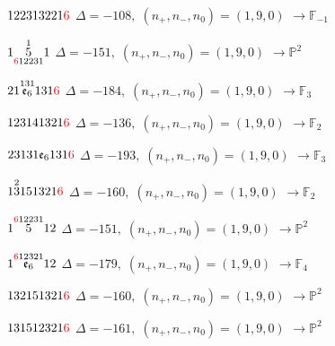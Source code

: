 \documentclass[10pt]{article}
\begin{document}
\smallskip

$122313221\textcolor{red}{6}$ \quad $\Delta=-108,\; (n_+,n_-,n_0)=(1,9,0)$ \quad $\to \mathbb{F}_{-1}$

\smallskip

$1\overset{1}{\underset{\textcolor{red}{6}12231}{5}}1$ \quad $\Delta=-151,\; (n_+,n_-,n_0)=(1,9,0)$ \quad $\to \mathbb{P}^2$

\smallskip

$21\overset{131}{\mathfrak{e}_6}131\textcolor{red}{6}$ \quad $\Delta=-184,\; (n_+,n_-,n_0)=(1,9,0)$ \quad $\to \mathbb{F}_{3}$

\smallskip

$123141321\textcolor{red}{6}$ \quad $\Delta=-136,\; (n_+,n_-,n_0)=(1,9,0)$ \quad $\to \mathbb{F}_{2}$

\smallskip

$23131\mathfrak{e}_6131\textcolor{red}{6}$ \quad $\Delta=-193,\; (n_+,n_-,n_0)=(1,9,0)$ \quad $\to \mathbb{F}_{3}$

\smallskip

$1\overset{2}{3}151321\textcolor{red}{6}$ \quad $\Delta=-160,\; (n_+,n_-,n_0)=(1,9,0)$ \quad $\to \mathbb{F}_{2}$

\smallskip

$1\overset{\textcolor{red}{6}12231}{5}12$ \quad $\Delta=-151,\; (n_+,n_-,n_0)=(1,9,0)$ \quad $\to \mathbb{P}^2$

\smallskip

$1\overset{\textcolor{red}{6}12321}{\mathfrak{e}_6}12$ \quad $\Delta=-179,\; (n_+,n_-,n_0)=(1,9,0)$ \quad $\to \mathbb{F}_{4}$

\smallskip

$132151321\textcolor{red}{6}$ \quad $\Delta=-160,\; (n_+,n_-,n_0)=(1,9,0)$ \quad $\to \mathbb{P}^2$

\smallskip

$131512321\textcolor{red}{6}$ \quad $\Delta=-161,\; (n_+,n_-,n_0)=(1,9,0)$ \quad $\to \mathbb{P}^2$
\end{document}
